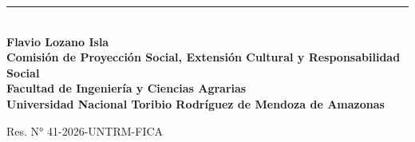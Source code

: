 \documentclass[
]{article}
\begin{document}
\vspace{2cm}

\begin{center}
  \noindent\rule{7cm}{0.4pt} \\[0.3cm]
  \textbf{Flavio Lozano Isla} \\[0.1cm]
  \fontsize{8}{10}\selectfont \textbf {Comisión de Proyección Social, Extensión Cultural y Responsabilidad Social\\[0.1cm]
  Facultad de Ingeniería y Ciencias Agrarias\\[0.1cm]
  Universidad Nacional Toribio Rodríguez de Mendoza de Amazonas}
\end{center}

\vfill

\begin{flushright}
  {\footnotesize Res. N° 41-2026-UNTRM-FICA}
\end{flushright}
\end{document}
